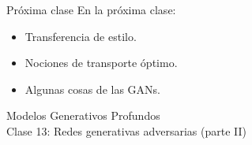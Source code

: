 \documentclass{beamer}
\begin{document}
\begin{frame}{Próxima clase}
    En la próxima clase:
    \begin{itemize}
        \item Transferencia de estilo.
        \item Nociones de transporte óptimo.
        \item Algunas cosas de las GANs.
    \end{itemize}
\end{frame}

\begin{frame}
    \centering
    \Large{Modelos Generativos Profundos}\\
    \large{Clase 13: Redes generativas adversarias (parte II)}
\end{frame}
\end{document}

